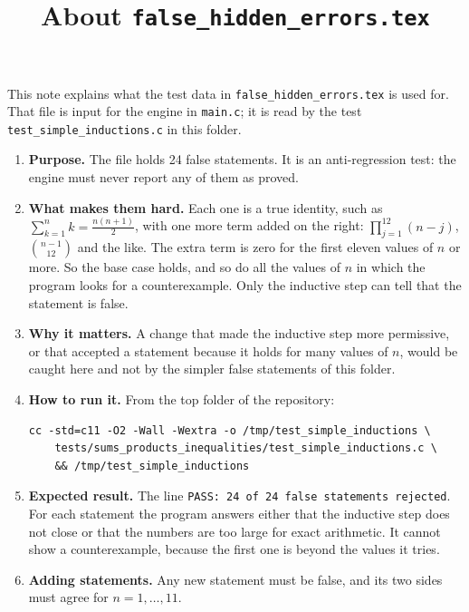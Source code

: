 \documentclass[11pt,a4paper]{article}
\title{About \texttt{false\_hidden\_errors.tex}}
\author{}
\date{}
\begin{document}
\maketitle
This note explains what the test data in \texttt{false\_hidden\_errors.tex} is used for. That file is input for the engine in \texttt{main.c}; it is read by the test \texttt{test\_simple\_inductions.c} in this folder.

\begin{enumerate}
\item \textbf{Purpose.} The file holds 24 false statements. It is an anti-regression test: the engine must never report any of them as proved.

\item \textbf{What makes them hard.} Each one is a true identity, such as $\sum_{k=1}^{n} k = \frac{n(n + 1)}{2}$, with one more term added on the right: $\prod_{j=1}^{12} (n - j)$, $\binom{n - 1}{12}$ and the like. The extra term is zero for the first eleven values of $n$ or more. So the base case holds, and so do all the values of $n$ in which the program looks for a counterexample. Only the inductive step can tell that the statement is false.

\item \textbf{Why it matters.} A change that made the inductive step more permissive, or that accepted a statement because it holds for many values of $n$, would be caught here and not by the simpler false statements of this folder.

\item \textbf{How to run it.} From the top folder of the repository:
\begin{verbatim}
cc -std=c11 -O2 -Wall -Wextra -o /tmp/test_simple_inductions \
    tests/sums_products_inequalities/test_simple_inductions.c \
    && /tmp/test_simple_inductions
\end{verbatim}

\item \textbf{Expected result.} The line \texttt{PASS: 24 of 24 false statements rejected}. For each statement the program answers either that the inductive step does not close or that the numbers are too large for exact arithmetic. It cannot show a counterexample, because the first one is beyond the values it tries.

\item \textbf{Adding statements.} Any new statement must be false, and its two sides must agree for $n = 1, \ldots, 11$.
\end{enumerate}
\end{document}
